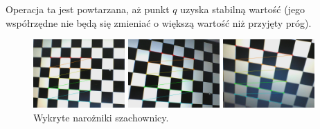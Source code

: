 \documentclass{article}
\begin{document}
Operacja ta jest powtarzana, aż punkt $q$ uzyska stabilną wartość (jego współrzędne nie będą się zmieniać o większą wartość niż przyjęty próg).

\begin{figure}
\centering
		\begin{minipage}{3.5cm}
			\includegraphics[width=3.5cm]{left1.jpg}
		\end{minipage}
		\begin{minipage}{3.5cm}
			\includegraphics[width=3.5cm]{left10.jpg}
		\end{minipage}
		\begin{minipage}{3.5cm}
			\includegraphics[width=3.5cm]{left27.jpg}
		\end{minipage}
	\caption{Wykryte narożniki szachownicy. }
	\label{fig:corners}
\end{figure}
\end{document}
